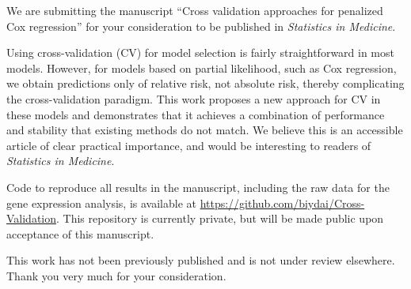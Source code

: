\documentclass{uiletter}
\begin{document}

We are submitting the manuscript ``Cross validation approaches for penalized Cox regression'' for your consideration to be published in {\em Statistics in Medicine}.

Using cross-validation (CV) for model selection is fairly straightforward in most models.  However, for models based on partial likelihood, such as Cox regression, we obtain predictions only of relative risk, not absolute risk, thereby complicating the cross-validation paradigm.  This work proposes a new approach for CV in these models and demonstrates that it achieves a combination of performance and stability that existing methods do not match.  We believe this is an accessible article of clear practical importance, and would be interesting to readers of {\em Statistics in Medicine}.

Code to reproduce all results in the manuscript, including the raw data for the gene expression analysis, is available at \url{https://github.com/biydai/Cross-Validation}.  This repository is currently private, but will be made public upon acceptance of this manuscript.

This work has not been previously published and is not under review elsewhere.  Thank you very much for your consideration.

\EndLetter
\end{document}

